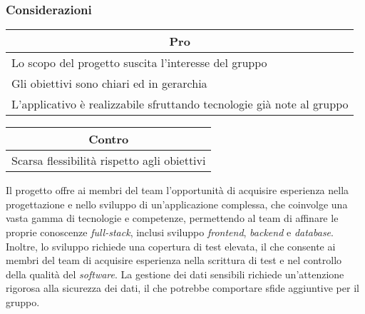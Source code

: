 \subsubsection{Considerazioni}
\begin{minipage}[t]{0.45\linewidth}
    \vspace{0pt}
    {\renewcommand{\arraystretch}{1.5}
    \begin{tabular}{p{1\linewidth}}
        \multicolumn{1}{c}{\textbf{Pro}} \\
        \midrule
        Lo scopo del progetto suscita l'interesse del gruppo \\
        Gli obiettivi sono chiari ed in gerarchia \\
        L'applicativo è realizzabile sfruttando tecnologie già note al gruppo \\
        \hline
    \end{tabular}
    }
\end{minipage}
\hspace{0.05\linewidth}
\begin{minipage}[t]{0.45\linewidth}
    \vspace{0pt}
    {\renewcommand{\arraystretch}{1.5}
    \begin{tabular}{p{1\linewidth}}
        \multicolumn{1}{c}{\textbf{Contro}} \\
        \midrule
        Scarsa flessibilità rispetto agli obiettivi \\
        \hline
    \end{tabular}
    }
\end{minipage}
\vspace{1em}

Il progetto offre ai membri del team l'opportunità di acquisire esperienza nella progettazione e nello sviluppo di un'applicazione complessa, che coinvolge una vasta gamma di tecnologie e competenze, permettendo al team di affinare le proprie conoscenze \textit{full-stack}, inclusi sviluppo \textit{frontend}, \textit{backend} e \textit{database}.
Inoltre, lo sviluppo richiede una copertura di test elevata, il che consente ai membri del team di acquisire esperienza nella scrittura di test e nel controllo della qualità del \textit{software}.
La gestione dei dati sensibili richiede un'attenzione rigorosa alla sicurezza dei dati, il che potrebbe comportare sfide aggiuntive per il gruppo.
